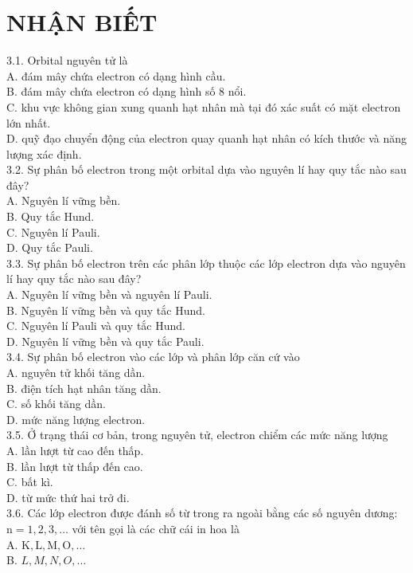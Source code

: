 \documentclass[10pt]{article}
\begin{document}
\section*{NHẬN BIẾT}
3.1. Orbital nguyên tử là\\
A. đám mây chứa electron có dạng hình cầu.\\
B. đám mây chứa electron có dạng hình số 8 nổi.\\
C. khu vực không gian xung quanh hạt nhân mà tại đó xác suất có mặt electron lớn nhất.\\
D. quỹ đạo chuyển động của electron quay quanh hạt nhân có kích thước và năng lượng xác định.\\
3.2. Sự phân bố electron trong một orbital dựa vào nguyên lí hay quy tắc nào sau đây?\\
A. Nguyên lí vững bền.\\
B. Quy tắc Hund.\\
C. Nguyên lí Pauli.\\
D. Quy tắc Pauli.\\
3.3. Sự phân bố electron trên các phân lớp thuộc các lớp electron dựa vào nguyên lí hay quy tắc nào sau đây?\\
A. Nguyên lí vững bền và nguyên lí Pauli.\\
B. Nguyên lí vững bền và quy tắc Hund.\\
C. Nguyên lí Pauli và quy tắc Hund.\\
D. Nguyên lí vững bền và quy tắc Pauli.\\
3.4. Sự phân bố electron vào các lớp và phân lớp căn cứ vào\\
A. nguyên tử khối tăng dần.\\
B. điện tích hạt nhân tăng dần.\\
C. số khối tăng dần.\\
D. mức năng lượng electron.\\
3.5. Ở trạng thái cơ bản, trong nguyên tử, electron chiểm các mức năng lượng\\
A. lần lượt từ cao đến thấp.\\
B. lần lượt từ thấp đến cao.\\
C. bất kì.\\
D. từ mức thứ hai trở đi.\\
3.6. Các lớp electron được đánh số từ trong ra ngoài bằng các số nguyên dương: $\mathrm{n}=1,2,3, \ldots$ với tên gọi là các chữ cái in hoa là\\
A. $\mathrm{K}, \mathrm{L}, \mathrm{M}, \mathrm{O}, \ldots$\\
B. $L, M, N, O, \ldots$\\
\end{document}
